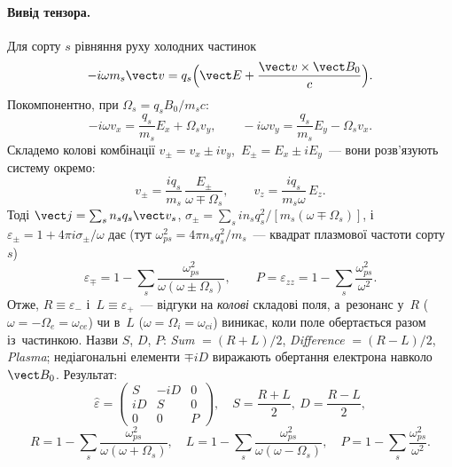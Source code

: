 \paragraph{Вивід тензора.}
Для сорту $s$ рівняння руху холодних частинок
\[-i\omega m_s\vect v=q_s\Bigl(\vect E+\frac{\vect v\times\vect B_0}c\Bigr).\]
Покомпонентно, при $\Omega_s=q_sB_0/m_sc$:
\[-i\omega v_x=\frac{q_s}{m_s}E_x+\Omega_s v_y,\qquad -i\omega v_y=\frac{q_s}{m_s}E_y-\Omega_s v_x.\]
Складемо колові комбінації $v_\pm=v_x\pm iv_y$,\ $E_\pm=E_x\pm iE_y$~--- вони розв'язують систему окремо:
\[v_\pm=\frac{iq_s}{m_s}\,\frac{E_\pm}{\omega\mp\Omega_s},\qquad v_z=\frac{iq_s}{m_s\omega}\,E_z.\]
Тоді $\vect j=\sum_sn_sq_s\vect v_s$, $\sigma_\pm=\sum_s in_s q_s^2/[m_s(\omega\mp\Omega_s)]$, і~$\varepsilon_\pm=1+4\pi i\sigma_\pm/\omega$ дає (тут $\omega_{ps}^2=4\pi n_sq_s^2/m_s$~--- квадрат плазмової частоти сорту $s$)
\[\varepsilon_\mp=1-\sum_s\frac{\omega_{ps}^2}{\omega(\omega\pm\Omega_s)},\qquad P=\varepsilon_{zz}=1-\sum_s\frac{\omega_{ps}^2}{\omega^2}.\]
Отже, $R\equiv\varepsilon_-$ і~$L\equiv\varepsilon_+$~--- відгуки на \emph{колові} складові поля, а~резонанс у~$R$ ($\omega=-\Omega_e=\omega_{ce}$)
чи в~$L$ ($\omega=\Omega_i=\omega_{ci}$) виникає, коли поле обертається разом із~частинкою. Назви $S$, $D$, $P$:
\emph{Sum} $=(R+L)/2$, \emph{Difference} $=(R-L)/2$, \emph{Plasma}; недіагональні елементи $\mp iD$ виражають обертання
електрона навколо $\vect B_0$. Результат:
\begin{equation}\label{eq:stix-tensor}
	\hat\varepsilon=\begin{pmatrix}S&-iD&0\\ iD&S&0\\0&0&P\end{pmatrix},\quad
	S=\frac{R+L}2,\ D=\frac{R-L}2,
\end{equation}
\begin{equation}\label{eq:stix-RLP}
	R=1-\sum_s\frac{\omega_{ps}^2}{\omega(\omega+\Omega_s)},\quad
	L=1-\sum_s\frac{\omega_{ps}^2}{\omega(\omega-\Omega_s)},\quad
	P=1-\sum_s\frac{\omega_{ps}^2}{\omega^2}.
\end{equation}
